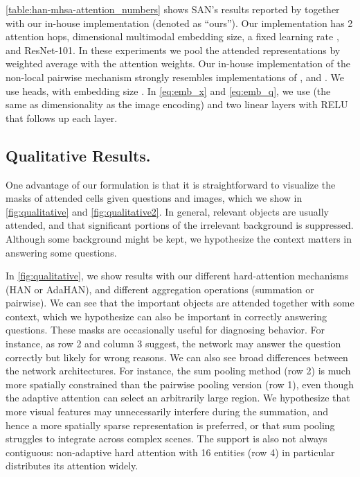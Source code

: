 \autoref{table:han-mhsa-attention_numbers} shows SAN's \cite{yang2015stacked} results reported by \cite{agrawal2017don} together with our in-house implementation (denoted as ``ours''). Our implementation has 2 attention hops,  dimensional multimodal embedding size, a fixed learning rate , and ResNet-101. In these experiments we pool the attended representations by weighted average with the attention weights.
Our in-house implementation of the non-local pairwise mechanism strongly resembles implementations of \cite{wang2017non}, and \cite{vaswani2017attention}. We use  heads, with embedding size .
In \autoref{eq:emb_x} and \autoref{eq:emb_q}, we use  (the same as dimensionality as the image encoding) and two linear layers with RELU that follows up each layer.


\subsection{Qualitative Results.}
\label{sec:qualitative}
One advantage of our formulation is that it is straightforward to visualize the masks of attended cells given questions and images, which we show in \autoref{fig:qualitative} and \autoref{fig:qualitative2}.
In general, relevant objects are usually attended, and that significant portions of the irrelevant background is suppressed. Although some background might be kept, we hypothesize the context matters in answering some questions.

In \autoref{fig:qualitative}, we show results with our different hard-attention mechanisms (HAN or AdaHAN), and different aggregation operations (summation or pairwise). We can see that the important objects are attended together with some context, which we hypothesize can also be important in correctly answering questions. These masks
are occasionally useful for diagnosing behavior. For instance, as row 2 and column 3 suggest, the network may answer the question correctly but likely for wrong reasons. 
We can also see broad differences between the network architectures.  For instance, the sum pooling method (row 2) is much more spatially constrained than the pairwise pooling version (row 1), even though the adaptive attention can select an arbitrarily large region.   We hypothesize that more visual features may unnecessarily interfere during the summation, and hence a more spatially sparse representation is preferred, or that sum pooling struggles to integrate across complex scenes.  The support is also not always contiguous: non-adaptive hard attention with 16 entities (row 4) in particular distributes its attention widely. 



